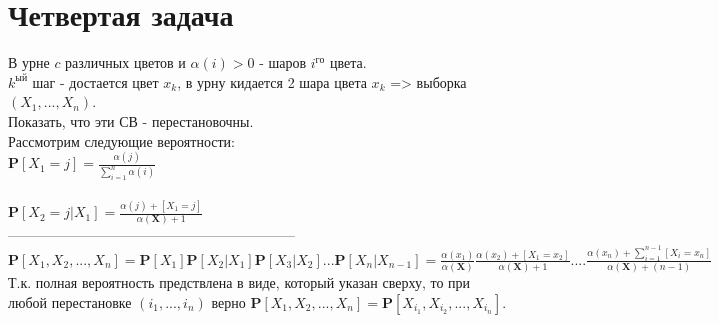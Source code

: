 \documentclass{article}
\begin{document}
\section{Четвертая задача}
В урне $c$ различных цветов и $\alpha(i) > 0$ - шаров $i^{го}$ цвета.\\
$k^{ый}$ шаг - достается цвет $x_k$, в урну кидается 2 шара цвета $x_k$ => выборка $(X_1,...,X_n)$.\\
Показать, что эти СВ - перестановочны.
\\
Рассмотрим следующие вероятности:\\
$\mathbf{P}[X_1 = j] = \frac{\alpha(j)}{\sum\limits_{i=1}^n \alpha(i)}$ \\
\\
$\mathbf{P}[X_2 = j|X_1] = \frac{\alpha(j) + [X_1 = j]}{\alpha(\mathbf{X}) + 1}$\\
--------------------------------------------------------------\\
$\mathbf{P}[X_1,X_2,...,X_n] = \mathbf{P}[X_1]\mathbf{P}[X_2|X_1]\mathbf{P}[X_3|X_2]...\mathbf{P}[X_n|X_{n-1}] = \frac{\alpha(x_1)}{\alpha(\mathbf{X})}\frac{\alpha(x_2) + [X_1 = x_2]}{\alpha(\mathbf{X})+1}....\frac{\alpha(x_n) + \sum\limits_{i=1}^{n-1}[X_i = x_n]}{\alpha(\mathbf{X}) + (n-1)}$\\
Т.к. полная вероятность предствлена в виде, который указан сверху, то при любой перестановке $(i_1,...,i_n)$ верно $\mathbf{P}[X_1,X_2,...,X_n] = \mathbf{P}[X_{i_1},X_{i_2},...,X_{i_n}]$. 
\end{document}
